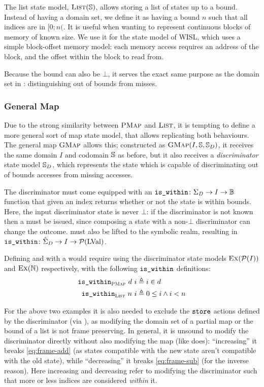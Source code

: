 The list state model, $\textsc{List}(\mathbb S)$, allows storing a list of states up to a bound. Instead of having a domain set, we define it as having a bound $n$ such that all indices are in $[0;n($. It is useful when wanting to represent continuous blocks of memory of known size. We use it for the state model of WISL, which uses a simple block-offset memory model: each memory access requires an address of the block, and the offset within the block to read from.

Because the bound can also be $\bot$, it serves the exact same purpose as the domain set in \PMap{}: distinguishing out of bounds from misses.

\subsubsection{General Map}

Due to the strong similarity between $\textsc{PMap}$ and $\textsc{List}$, it is tempting to define a more general sort of map state model, that allows replicating both behaviours. The general map $\textsc{GMap}$ allows this; constructed as $\textsc{GMap}(I,\mathbb S,\mathbb S_D)$, it receives the same domain $I$ and codomain $\mathbb S$ as before, but it also receives a \emph{discriminator} state model $\mathbb S_D$, which represents the state which is capable of discriminating out of bounds accesses from missing accesses.

The discriminator must come equipped with an $\texttt{is\_within}\colon \Sigma_D \rightarrow I \rightarrow \mathbb{B}$ function that given an index returns whether or not the state is within bounds. Here, the input discriminator state is never $\bot$: if the discriminator is not known then a \Miss{} must be issued, since composing a state with a non-$\bot$ discriminator can change the outcome.  must also be lifted to the symbolic realm, resulting in $\texttt{is\_within}\colon \hat{\Sigma}_D\rightarrow I\rightarrow {\cal P}(\text{LVal})$.

Defining \PMap{} and \List{} with a \GMap{} would require using the discriminator state models $\textsc{Ex}({\cal P}(I))$ and $\textsc{Ex}(\mathbb N)$ respectively, with the following $\texttt{is\_within}$ definitions: \begin{align*}
	\texttt{is\_within}_{\textsc{PMap}}~d~i&\triangleq i\in d\\
	\texttt{is\_within}_{\textsc{List}}~n~i&\triangleq 0 \leq i \land i < n
\end{align*}

For the above two examples it is also needed to exclude the $\texttt{store}$ actions defined by the discriminator (via \Ex), as modifying the domain set of a partial map or the bound of a list is not frame preserving. In general, it is unsound to modify the discriminator directly without also modifying the map (like \alloc{} does): ``increasing'' it breaks \ref{eq:frame-add} (as states compatible with the new state aren't compatible with the old state), while ``decreasing'' it breaks \ref{eq:frame-sub} (for the inverse reason). Here increasing and decreasing refer to modifying the discriminator such that more or less indices are considered \emph{within} it.


